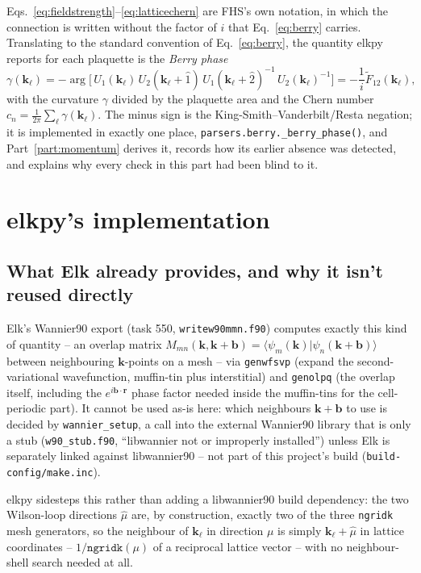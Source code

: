 \documentclass[11pt]{article}
\begin{document}
Eqs.~\eqref{eq:fieldstrength}--\eqref{eq:latticechern} are FHS's own notation, in which
the connection is written without the factor of $i$ that Eq.~\eqref{eq:berry} carries.
Translating to the standard convention of Eq.~\eqref{eq:berry}, the quantity elkpy
reports for each plaquette is the \emph{Berry phase}
\begin{equation}
  \gamma(\mathbf k_\ell)
    = -\arg\bigl[\,U_1(\mathbf k_\ell)\, U_2(\mathbf k_\ell+\hat 1)\,
        U_1(\mathbf k_\ell+\hat 2)^{-1}\, U_2(\mathbf k_\ell)^{-1}\bigr]
    = -\frac{1}{i}\tilde F_{12}(\mathbf k_\ell),
  \label{eq:elkpyflux}
\end{equation}
with the curvature $\gamma$ divided by the plaquette area and the Chern number
$c_n=\frac{1}{2\pi}\sum_\ell\gamma(\mathbf k_\ell)$. The minus sign is the
King-Smith--Vanderbilt/Resta negation; it is implemented in exactly one place,
\texttt{parsers.berry.\_berry\_phase()}, and Part~\ref{part:momentum} derives it, records
how its earlier absence was detected, and explains why every check in this part had been
blind to it.

\section{elkpy's implementation}

\subsection{What Elk already provides, and why it isn't reused directly}

Elk's Wannier90 export (task 550, \texttt{writew90mmn.f90}) computes exactly this kind
of quantity -- an overlap matrix $M_{mn}(\mathbf k,\mathbf k+\mathbf b) = \langle
\psi_m(\mathbf k)|\psi_n(\mathbf k+\mathbf b)\rangle$ between neighbouring $\mathbf
k$-points on a mesh -- via \texttt{genwfsvp} (expand the second-variational
wavefunction, muffin-tin plus interstitial) and \texttt{genolpq} (the overlap itself,
including the $e^{i\mathbf b\cdot\mathbf r}$ phase factor needed inside the muffin-tins
for the cell-periodic part). It cannot be used as-is here: which neighbours
$\mathbf k+\mathbf b$ to use is decided by \texttt{wannier\_setup}, a call into the
external Wannier90 library that is only a stub (\texttt{w90\_stub.f90}, ``libwannier not
or improperly installed'') unless Elk is separately linked against libwannier90 -- not
part of this project's build (\texttt{build-config/make.inc}).

elkpy sidesteps this rather than adding a libwannier90 build dependency: the two
Wilson-loop directions $\hat\mu$ are, by construction, exactly two of the three
\texttt{ngridk} mesh generators, so the neighbour of $\mathbf k_\ell$ in direction $\mu$
is simply $\mathbf k_\ell + \hat\mu$ in lattice coordinates -- $1/\texttt{ngridk}(\mu)$
of a reciprocal lattice vector -- with no neighbour-shell search needed at all.
\end{document}
